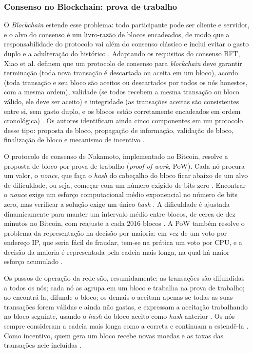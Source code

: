 \subsubsection{Consenso no Blockchain: prova de trabalho}

O \textit{Blockchain} estende esse problema: todo participante pode ser cliente e servidor, e o alvo do consenso é um livro-razão de blocos encadeados, de modo que a responsabilidade do protocolo vai além do consenso clássico e inclui evitar o gasto duplo e a adulteração do histórico \cite{Xiao2020}. Adaptando os requisitos do consenso BFT, Xiao et al. definem que um protocolo de consenso para \textit{blockchain} deve garantir terminação (toda nova transação é descartada ou aceita em um bloco), acordo (toda transação e seu bloco são aceitos ou descartados por todos os nós honestos, com a mesma ordem), validade (se todos recebem a mesma transação ou bloco válido, ele deve ser aceito) e integridade (as transações aceitas são consistentes entre si, sem gasto duplo, e os blocos estão corretamente encadeados em ordem cronológica) \cite{Xiao2020}. Os autores identificam ainda cinco componentes em um protocolo desse tipo: proposta de bloco, propagação de informação, validação de bloco, finalização de bloco e mecanismo de incentivo \cite{Xiao2020}.

O protocolo de consenso de Nakamoto, implementado no Bitcoin, resolve a proposta de bloco por prova de trabalho (\textit{proof of work}, PoW). Cada nó procura um valor, o \textit{nonce}, que faça o \textit{hash} do cabeçalho do bloco ficar abaixo de um alvo de dificuldade, ou seja, começar com um número exigido de bits zero \cite{nakamoto2008bitcoin,Xiao2020}. Encontrar o \textit{nonce} exige um esforço computacional médio exponencial no número de bits zero, mas verificar a solução exige um único \textit{hash} \cite{nakamoto2008bitcoin}. A dificuldade é ajustada dinamicamente para manter um intervalo médio entre blocos, de cerca de dez minutos no Bitcoin, com reajuste a cada 2016 blocos \cite{Xiao2020}. A PoW também resolve o problema da representação na decisão por maioria: em vez de um voto por endereço IP, que seria fácil de fraudar, tem-se na prática um voto por CPU, e a decisão da maioria é representada pela cadeia mais longa, na qual há maior esforço acumulado \cite{nakamoto2008bitcoin}.

Os passos de operação da rede são, resumidamente: as transações são difundidas a todos os nós; cada nó as agrupa em um bloco e trabalha na prova de trabalho; ao encontrá-la, difunde o bloco; os demais o aceitam apenas se todas as suas transações forem válidas e ainda não gastas, e expressam a aceitação trabalhando no bloco seguinte, usando o \textit{hash} do bloco aceito como \textit{hash} anterior \cite{nakamoto2008bitcoin}. Os nós sempre consideram a cadeia mais longa como a correta e continuam a estendê-la \cite{nakamoto2008bitcoin}. Como incentivo, quem gera um bloco recebe novas moedas e as taxas das transações nele incluídas \cite{nakamoto2008bitcoin,Xiao2020}.

